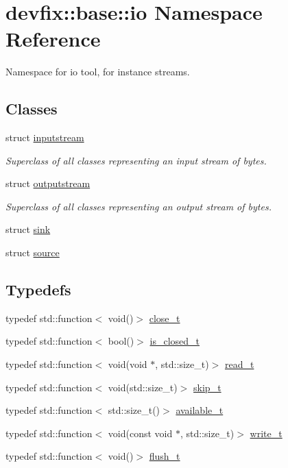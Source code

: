 \hypertarget{namespacedevfix_1_1base_1_1io}{}\section{devfix\+:\+:base\+:\+:io Namespace Reference}
\label{namespacedevfix_1_1base_1_1io}


Namespace for io tool, for instance streams.  


\subsection*{Classes}
\begin{DoxyCompactItemize}
\item 
struct \hyperlink{structdevfix_1_1base_1_1io_1_1inputstream}{inputstream}
\begin{DoxyCompactList}\small\item\em Superclass of all classes representing an input stream of bytes. \end{DoxyCompactList}\item 
struct \hyperlink{structdevfix_1_1base_1_1io_1_1outputstream}{outputstream}
\begin{DoxyCompactList}\small\item\em Superclass of all classes representing an output stream of bytes. \end{DoxyCompactList}\item 
struct \hyperlink{structdevfix_1_1base_1_1io_1_1sink}{sink}
\item 
struct \hyperlink{structdevfix_1_1base_1_1io_1_1source}{source}
\end{DoxyCompactItemize}
\subsection*{Typedefs}
\begin{DoxyCompactItemize}
\item 
typedef std\+::function$<$ void()$>$ \hyperlink{namespacedevfix_1_1base_1_1io_ae3118387742e5f4d484a328a213d6a5d}{close\+\_\+t}
\item 
typedef std\+::function$<$ bool()$>$ \hyperlink{namespacedevfix_1_1base_1_1io_a14f89d4437ced6ede49c044ee8e71f17}{is\+\_\+closed\+\_\+t}
\item 
typedef std\+::function$<$ void(void $\ast$, std\+::size\+\_\+t)$>$ \hyperlink{namespacedevfix_1_1base_1_1io_afa65222ee5a1636be18df5e16bbcf858}{read\+\_\+t}
\item 
typedef std\+::function$<$ void(std\+::size\+\_\+t)$>$ \hyperlink{namespacedevfix_1_1base_1_1io_aeb8f94d85cfeaa405f53a6967e609645}{skip\+\_\+t}
\item 
typedef std\+::function$<$ std\+::size\+\_\+t()$>$ \hyperlink{namespacedevfix_1_1base_1_1io_a19c1195ab6a44e6d4f48b86062860a11}{available\+\_\+t}
\item 
typedef std\+::function$<$ void(const void $\ast$, std\+::size\+\_\+t)$>$ \hyperlink{namespacedevfix_1_1base_1_1io_a75953e4d7f81d76e419f9672ffedda87}{write\+\_\+t}
\item 
typedef std\+::function$<$ void()$>$ \hyperlink{namespacedevfix_1_1base_1_1io_a622685976c7f503411827fba028d3ce1}{flush\+\_\+t}
\end{DoxyCompactItemize}
